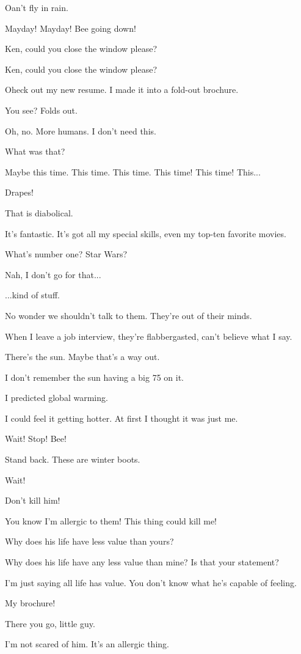 \documentclass[journal]{IEEEtran}
\begin{document}
  
Oan't fly in rain.

  
Mayday! Mayday! Bee going down!

  
Ken, could you close
the window please?

  
Ken, could you close
the window please?

  
Oheck out my new resume.
I made it into a fold-out brochure.

  
You see? Folds out.

  
Oh, no. More humans. I don't need this.

  
What was that?

  
Maybe this time. This time. This time.
This time! This time! This...

  
Drapes!

  
That is diabolical.

  
It's fantastic. It's got all my special
skills, even my top-ten favorite movies.

  
What's number one? Star Wars?

  
Nah, I don't go for that...

  
...kind of stuff.

  
No wonder we shouldn't talk to them.
They're out of their minds.

  
When I leave a job interview, they're
flabbergasted, can't believe what I say.

  
There's the sun. Maybe that's a way out.

  
I don't remember the sun
having a big 75 on it.

  
I predicted global warming.

  
I could feel it getting hotter.
At first I thought it was just me.

  
Wait! Stop! Bee!

  
Stand back. These are winter boots.

  
Wait!

  
Don't kill him!

  
You know I'm allergic to them!
This thing could kill me!

  
Why does his life have
less value than yours?

  
Why does his life have any less value
than mine? Is that your statement?

  
I'm just saying all life has value. You
don't know what he's capable of feeling.

  
My brochure!

  
There you go, little guy.

  
I'm not scared of him.
It's an allergic thing.
\end{document}

